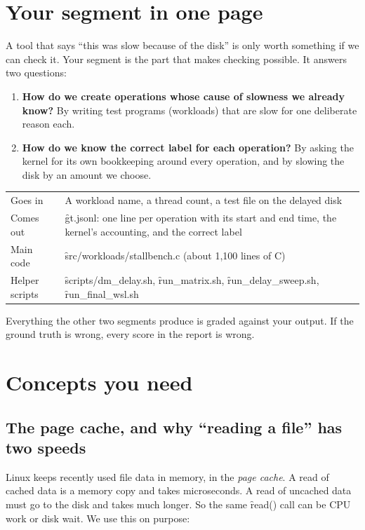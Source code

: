 \documentclass[11pt]{article}
\begin{document}

\section{Your segment in one page}


A tool that says ``this was slow because of the disk'' is only worth something if we can check it. Your segment is the part that makes checking possible. It answers two questions:

\begin{enumerate}
\item \textbf{How do we create operations whose cause of slowness we already know?} By writing test programs (workloads) that are slow for one deliberate reason each.
\item \textbf{How do we know the correct label for each operation?} By asking the kernel for its own bookkeeping around every operation, and by slowing the disk by an amount we choose.
\end{enumerate}

\begin{center}
\begin{tabularx}{\textwidth}{@{}lY@{}}
\toprule
Goes in & A workload name, a thread count, a test file on the delayed disk \\
Comes out & \f{gt.jsonl}: one line per operation with its start and end time, the kernel's accounting, and the correct label \\
Main code & \f{src/workloads/stallbench.c} (about 1{,}100 lines of C) \\
Helper scripts & \f{scripts/dm\_delay.sh}, \f{run\_matrix.sh}, \f{run\_delay\_sweep.sh}, \f{run\_final\_wsl.sh} \\
\bottomrule
\end{tabularx}
\end{center}

Everything the other two segments produce is graded against your output. If the ground truth is wrong, every score in the report is wrong.

\section{Concepts you need}

\subsection{The page cache, and why ``reading a file'' has two speeds}
Linux keeps recently used file data in memory, in the \emph{page cache}. A read of cached data is a memory copy and takes microseconds. A read of uncached data must go to the disk and takes much longer. So the same \f{read()} call can be CPU work or disk wait. We use this on purpose:
\end{document}
